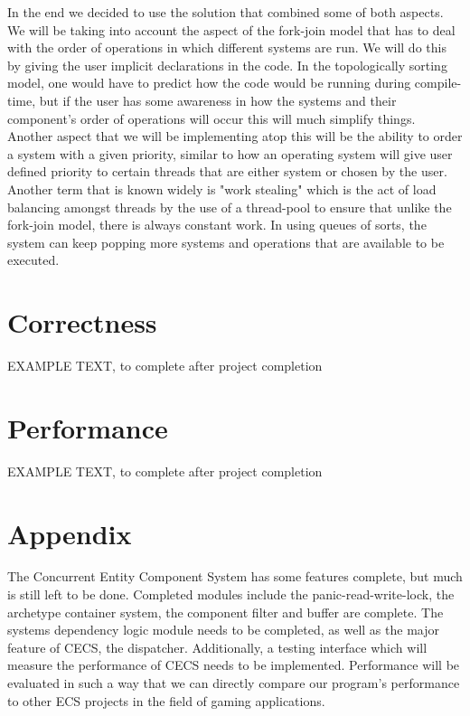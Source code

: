 \documentclass[conference]{IEEEtran}
\begin{document}
    In the end we decided to use the solution that combined some of both aspects. We will be taking into account the aspect of the fork-join model that has to deal with the order of operations in which different systems are run. We will do this by giving the user implicit declarations in the code. In the topologically sorting model, one would have to predict how the code would be running during compile-time, but if the user has some awareness in how the systems and their component's order of operations will occur this will much simplify things. Another aspect that we will be implementing atop this will be the ability to order a system with a given priority, similar to how an operating system will give user defined priority to certain threads that are either system or chosen by the user. Another term that is known widely is "work stealing" which is the act of load balancing amongst threads by the use of a thread-pool to ensure that unlike the fork-join model, there is always constant work. In using queues of sorts, the system can keep popping more systems and operations that are available to be executed.


\section{Correctness}



EXAMPLE TEXT, to complete after project completion

\section{Performance}



EXAMPLE TEXT, to complete after project completion

\section{Appendix}
The Concurrent Entity Component System has some features complete, but much is still left to be done. Completed modules include the panic-read-write-lock, the archetype container system, the component filter and buffer are complete. The systems dependency logic module needs to be completed, as well as the major feature of CECS, the dispatcher. Additionally, a testing interface which will measure the performance of CECS needs to be implemented. Performance will be evaluated in such a way that we can directly compare our program's performance to other ECS projects in the field of gaming applications. 

 
 
\end{document}
